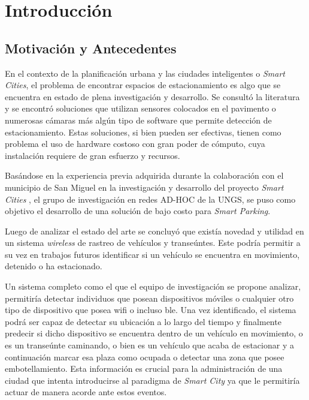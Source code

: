 \chapter{Introducción}

\label{Capitulo_1} %
\section{Motivación y Antecedentes}
En el contexto de la planificación urbana y las ciudades inteligentes o \textit{Smart Cities}, el problema de encontrar espacios de estacionamiento es algo que se encuentra en estado de plena investigación y desarrollo. Se consultó la literatura y se encontró soluciones que utilizan sensores colocados en el pavimento o numerosas cámaras más algún tipo de software que permite detección de estacionamiento. Estas soluciones, si bien pueden ser efectivas, tienen como problema el uso de hardware costoso con gran poder de cómputo, cuya instalación requiere de gran esfuerzo y recursos.

Basándose en la experiencia previa adquirida durante la colaboración con el municipio de San Miguel en la investigación y desarrollo del proyecto \textit{Smart Cities} \cite{sedici89263}, el grupo de investigación en redes AD-HOC de la UNGS, se puso como objetivo el desarrollo de una solución de bajo costo para \textit{Smart Parking}.

Luego de analizar el estado del arte se concluyó que existía novedad y utilidad en un sistema \textit{wireless} de rastreo de vehículos y transeúntes. Este podría permitir a su vez en trabajos futuros identificar si un vehículo se encuentra en movimiento, detenido o ha estacionado.

Un sistema completo como el que el equipo de investigación se propone analizar, permitiría detectar individuos que posean dispositivos móviles o cualquier otro tipo de dispositivo que posea \acs{wifi} o incluso \acs{ble}. Una vez identificado, el sistema podrá ser capaz de detectar su ubicación a lo largo del tiempo y finalmente predecir si dicho dispositivo se encuentra dentro de un vehículo en movimiento, o es un transeúnte caminando, o bien es un vehículo que acaba de estacionar y a continuación marcar esa plaza como ocupada o detectar una zona que posee embotellamiento. Esta información es crucial para la administración de una ciudad que intenta introducirse al paradigma de \textit{Smart City} ya que le permitiría actuar de manera acorde ante estos eventos.

